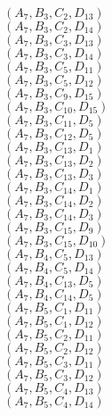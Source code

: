 \documentclass[14pt]{article}
\begin{document}
    $({A}_{7}, {B}_{3}, {C}_{2}, {D}_{13}) $ \\ 
    $({A}_{7}, {B}_{3}, {C}_{2}, {D}_{14}) $ \\ 
    $({A}_{7}, {B}_{3}, {C}_{3}, {D}_{13}) $ \\ 
    $({A}_{7}, {B}_{3}, {C}_{3}, {D}_{14}) $ \\ 
    $({A}_{7}, {B}_{3}, {C}_{5}, {D}_{11}) $ \\ 
    $({A}_{7}, {B}_{3}, {C}_{5}, {D}_{12}) $ \\ 
    $({A}_{7}, {B}_{3}, {C}_{9}, {D}_{15}) $ \\ 
    $({A}_{7}, {B}_{3}, {C}_{10}, {D}_{15}) $ \\ 
    $({A}_{7}, {B}_{3}, {C}_{11}, {D}_{5}) $ \\ 
    $({A}_{7}, {B}_{3}, {C}_{12}, {D}_{5}) $ \\ 
    $({A}_{7}, {B}_{3}, {C}_{13}, {D}_{1}) $ \\ 
    $({A}_{7}, {B}_{3}, {C}_{13}, {D}_{2}) $ \\ 
    $({A}_{7}, {B}_{3}, {C}_{13}, {D}_{3}) $ \\ 
    $({A}_{7}, {B}_{3}, {C}_{14}, {D}_{1}) $ \\ 
    $({A}_{7}, {B}_{3}, {C}_{14}, {D}_{2}) $ \\ 
    $({A}_{7}, {B}_{3}, {C}_{14}, {D}_{3}) $ \\ 
    $({A}_{7}, {B}_{3}, {C}_{15}, {D}_{9}) $ \\ 
    $({A}_{7}, {B}_{3}, {C}_{15}, {D}_{10}) $ \\ 
    $({A}_{7}, {B}_{4}, {C}_{5}, {D}_{13}) $ \\ 
    $({A}_{7}, {B}_{4}, {C}_{5}, {D}_{14}) $ \\ 
    $({A}_{7}, {B}_{4}, {C}_{13}, {D}_{5}) $ \\ 
    $({A}_{7}, {B}_{4}, {C}_{14}, {D}_{5}) $ \\ 
    $({A}_{7}, {B}_{5}, {C}_{1}, {D}_{11}) $ \\ 
    $({A}_{7}, {B}_{5}, {C}_{1}, {D}_{12}) $ \\ 
    $({A}_{7}, {B}_{5}, {C}_{2}, {D}_{11}) $ \\ 
    $({A}_{7}, {B}_{5}, {C}_{2}, {D}_{12}) $ \\ 
    $({A}_{7}, {B}_{5}, {C}_{3}, {D}_{11}) $ \\ 
    $({A}_{7}, {B}_{5}, {C}_{3}, {D}_{12}) $ \\ 
    $({A}_{7}, {B}_{5}, {C}_{4}, {D}_{13}) $ \\ 
    $({A}_{7}, {B}_{5}, {C}_{4}, {D}_{14}) $ \\ 
\end{document}
